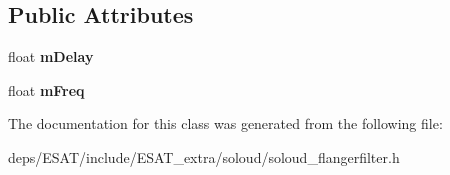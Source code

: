 \subsection*{Public Attributes}
\begin{DoxyCompactItemize}
\item 
\mbox{\label{class_so_loud_1_1_flanger_filter_ac86b7178e28c1717c809543e4e574dbe}} 
float {\bfseries m\+Delay}
\item 
\mbox{\label{class_so_loud_1_1_flanger_filter_ac3b426320f3d5666c6924e22afc9b451}} 
float {\bfseries m\+Freq}
\end{DoxyCompactItemize}


The documentation for this class was generated from the following file\+:\begin{DoxyCompactItemize}
\item 
deps/\+E\+S\+A\+T/include/\+E\+S\+A\+T\+\_\+extra/soloud/soloud\+\_\+flangerfilter.\+h\end{DoxyCompactItemize}
